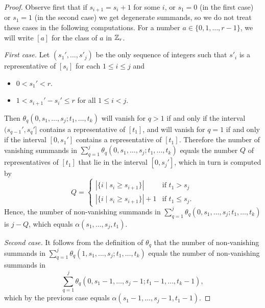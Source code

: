 \begin{proof}
	Observe first that if $s_{i+1} = s_i+1$ for some $i$, or $s_1 = 0$ (in the first case) or $s_1=1$ (in the second case) we get degenerate summands, so we do not treat these cases in the following computations. For a number $a\in \{0,1,\ldots,r-1\}$, we will write $[a]$ for the class of $a$ in $\mathbb{Z}_{r}$.

	{\em First case.} Let $(s_1',\ldots,s'_j)$ be the only sequence of integers such that $s'_i$ is a representative of $[s_i]$ for each $1\leq i\leq j$ and
	\begin{itemize}
		\item $0< s_1'< r$.
		\item $1<s_{i+1}'-s_i'\leq r$ for all $1\leq i<j$.
	\end{itemize}
	Then $\theta_q(0,s_1,\ldots,s_j;t_1,\ldots,t_k)$ will vanish for $q>1$ if and only if the interval $(s_{q-1}',s_q']$ contains a representative of $[t_1]$, and will vanish for $q=1$ if and only if the interval $[0,s_1']$ contains a representative of $[t_1]$. Therefore the number of vanishing summands in $\sum_{q=1}^j\theta_q(0,s_1,\ldots,s_j;t_1,\ldots,t_k)$ equals the number $Q$ of representatives of $[t_1]$ that lie in the interval $[0,s_j']$, which in turn is computed by
	\[
	Q = \begin{cases}
		|\{i\mid s_i\geq s_{i+1}\}| & \text{if $t_1>s_j$} \\
		|\{i\mid s_i\geq s_{i+1}\}|+1 & \text{if $t_1\leq s_j$}.
	\end{cases}
	\]
	Hence, the number of non-vanishing summands in $\sum_{q=1}^j\theta_q(0,s_1,\ldots,s_j;t_1,\ldots,t_k)$ is $j-Q$, which equals $\alpha(s_1,\ldots,s_j,t_1)$.

	{\em Second case.} It follows from the definition of $\theta_q$ that the number of non-vanishing summands in $\sum_{q=1}^j \theta_q(1,s_1,\ldots,s_j;t_1,\ldots,t_k)$ equals the number of non-vanishing summands in
	\[\sum_{q=1}^j \theta_q(0,s_1-1,\ldots,s_j-1;t_1-1,\ldots,t_k-1),\] which by the previous case equals $\alpha(s_1-1,\ldots,s_j-1,t_1-1)$.%
\end{proof}

